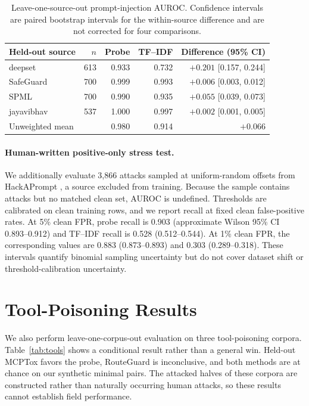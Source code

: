 \documentclass[10pt]{article}
\begin{document}
\begin{table}[t]
\centering
\small
\begin{tabular}{@{}lrrrr@{}}
\toprule
Held-out source & $n$ & Probe & TF--IDF & Difference (95\% CI) \\
\midrule
deepset      & 613 & 0.933 & 0.732 & $+0.201$ [0.157, 0.244] \\
SafeGuard    & 700 & 0.999 & 0.993 & $+0.006$ [0.003, 0.012] \\
SPML         & 700 & 0.990 & 0.935 & $+0.055$ [0.039, 0.073] \\
jayavibhav   & 537 & 1.000 & 0.997 & $+0.002$ [0.001, 0.005] \\
\midrule
Unweighted mean & & 0.980 & 0.914 & $+0.066$ \\
\bottomrule
\end{tabular}
\caption{Leave-one-source-out prompt-injection AUROC. Confidence intervals are paired bootstrap intervals for the within-source difference and are not corrected for four comparisons.}
\label{tab:loso}
\end{table}

\paragraph{Human-written positive-only stress test.}
We additionally evaluate 3,866 attacks sampled at uniform-random offsets from HackAPrompt \citep{schulhoff2023hackaprompt}, a source excluded from training. Because the sample contains attacks but no matched clean set, AUROC is undefined. Thresholds are calibrated on clean training rows, and we report recall at fixed clean false-positive rates. At 5\% clean FPR, probe recall is 0.903 (approximate Wilson 95\% CI 0.893--0.912) and TF--IDF recall is 0.528 (0.512--0.544). At 1\% clean FPR, the corresponding values are 0.883 (0.873--0.893) and 0.303 (0.289--0.318). These intervals quantify binomial sampling uncertainty but do not cover dataset shift or threshold-calibration uncertainty.

\section{Tool-Poisoning Results}

We also perform leave-one-corpus-out evaluation on three tool-poisoning corpora. Table~\ref{tab:tools} shows a conditional result rather than a general win. Held-out MCPTox favors the probe, RouteGuard is inconclusive, and both methods are at chance on our synthetic minimal pairs. The attacked halves of these corpora are constructed rather than naturally occurring human attacks, so these results cannot establish field performance.
\end{document}
